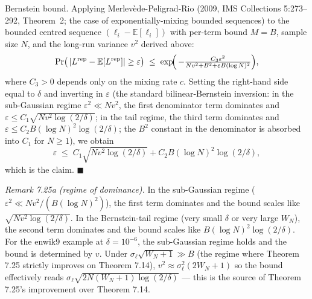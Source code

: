 \documentclass[
]{article}
\begin{document}
Bernstein bound. Applying Merlev\`ede-Peligrad-Rio (2009, IMS
Collections 5:273--292, Theorem~2; the case of exponentially-mixing
bounded sequences) to the bounded centred sequence
$(\ell_i - \mathbb{E}[\ell_i])$ with per-term bound $M = B$, sample
size $N$, and the long-run variance $v^2$ derived above:
\[
  \Pr\bigl(\,|L^{\mathrm{rep}} - \mathbb{E}[L^{\mathrm{rep}}]| \geq \varepsilon\bigr)
  \;\leq\; \exp\!\Bigl(\,
    -\tfrac{C_3 \varepsilon^2}{N v^2 + B^2 + \varepsilon B (\log N)^2}
  \Bigr) ,
\]
where $C_3 > 0$ depends only on the mixing rate $c$.
Setting the right-hand side equal to $\delta$ and inverting in
$\varepsilon$ (the standard bilinear-Bernstein inversion: in the
sub-Gaussian regime $\varepsilon^2 \ll N v^2$, the first denominator
term dominates and $\varepsilon \leq C_1 \sqrt{N v^2 \log(2/\delta)}$;
in the tail regime, the third term dominates and $\varepsilon \leq
C_2 B (\log N)^2 \log(2/\delta)$; the $B^2$ constant in the
denominator is absorbed into $C_1$ for $N \geq 1$), we obtain
\[
  \varepsilon \;\leq\; C_1 \sqrt{N v^2 \log(2/\delta)}
  + C_2 B (\log N)^2 \log(2/\delta),
\]
which is the claim. \hfill$\blacksquare$

\emph{Remark 7.25a (regime of dominance).}
In the sub-Gaussian regime ($\varepsilon^2 \ll N v^2 / (B (\log N)^2)$),
the first term dominates and the bound scales like
$\sqrt{N v^2 \log(2/\delta)}$. In the Bernstein-tail regime
(very small $\delta$ or very large $W_N$), the second term dominates
and the bound scales like $B (\log N)^2 \log(2/\delta)$.
For the enwik9 example at $\delta = 10^{-6}$, the sub-Gaussian regime
holds and the bound is determined by $v$. Under
$\sigma_\ell \sqrt{W_N+1} \gg B$ (the regime where Theorem 7.25
strictly improves on Theorem 7.14), $v^2 \approx \sigma_\ell^2 (2W_N+1)$
so the bound effectively reads $\sigma_\ell \sqrt{2 N (W_N+1) \log(2/\delta)}$
--- this is the source of Theorem 7.25's improvement over Theorem 7.14.
\end{document}
